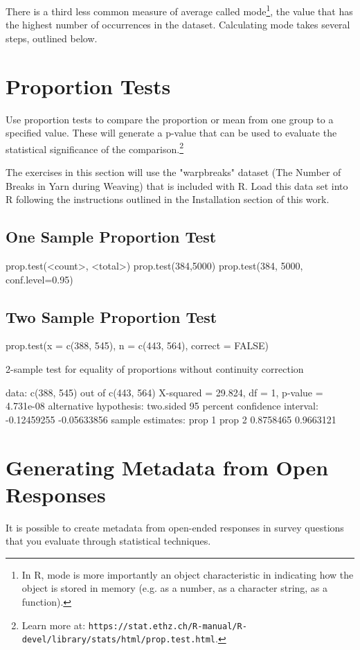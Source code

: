 There is a third less common measure of average called mode\footnote{In R, mode is more importantly an object characteristic in indicating how the object is stored in memory (e.g. as a number, as a character string, as a function).}, the value that has the highest number of occurrences in the dataset. Calculating mode takes several steps, outlined below.


\section{Proportion Tests}
Use proportion tests to compare the proportion or mean from one group to a specified value. These will generate a p-value that can be used to evaluate the statistical significance of the comparison.\footnote{Learn more at: \texttt{https://stat.ethz.ch/R-manual/R-devel/library/stats/html/prop.test.html}.}

The exercises in this section will use the "warpbreaks" dataset (The Number of Breaks in Yarn during Weaving) that is included with R. Load this data set into R following the instructions outlined in the Installation section of this work.

\subsection{One Sample Proportion Test}
prop.test(<count>, <total>)
prop.test(384,5000)
prop.test(384, 5000, conf.level=0.95)

\subsection{Two Sample Proportion Test}
prop.test(x = c(388, 545), n = c(443, 564), correct = FALSE)

2-sample test for equality of proportions without continuity
        correction

data:  c(388, 545) out of c(443, 564)
X-squared = 29.824, df = 1, p-value = 4.731e-08
alternative hypothesis: two.sided
95 percent confidence interval:
 -0.12459255 -0.05633856
sample estimates:
   prop 1    prop 2 
0.8758465 0.9663121 

\section{Generating Metadata from Open Responses}
It is possible to create metadata from open-ended responses in survey questions that you evaluate through statistical techniques.

